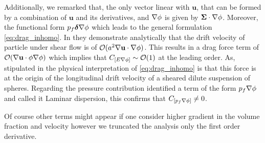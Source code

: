 Additionally, we remarked that, the only vector linear with $\textbf{u}$, that can be formed by a combination of $\textbf{u}$ and its derivatives, and $\mathbf{\nabla} \phi$ is given by $\bm\Sigma \cdot \mathbf{\nabla} \phi$.
Moreover, the functional form $p_f \bm\delta \mathbf{\nabla} \phi$ which leads to the general formulation  \ref{eq:drag_inhomo}. 
In \citet{wang1999longitudinal} they demonstrate analytically that the drift velocity of particle under shear flow is of $\mathcal{O}(a^2 \mathbf{\nabla} \textbf{u}\cdot \mathbf{\nabla} \phi)$.
This results in a drag force term of  $\mathcal{O}( \mathbf{\nabla} \textbf{u} \cdot \phi \mathbf{\nabla} \phi)$ which implies that $C_{[E \mathbf{\nabla}\phi ]} \sim \mathcal{O}(1)$ at the leading order. 
As, stipulated in \citet{wang1999longitudinal,guazzelli2011} the physical interpretation of \ref{eq:drag_inhomo} is that this force is at the origin of the longitudinal drift velocity of a sheared dilute suspension of spheres. 
Regarding the pressure contribution \citet{du2020bubble} identified a term of the form $p_f \mathbf{\nabla} \phi$ and called it Laminar dispersion, this confirms that $C_{[p_f \mathbf{\nabla}\phi ]}\neq 0$. 



Of course other terms might appear if one consider higher gradient in the volume fraction and velocity however we truncated the analysis only the first order derivative. 

